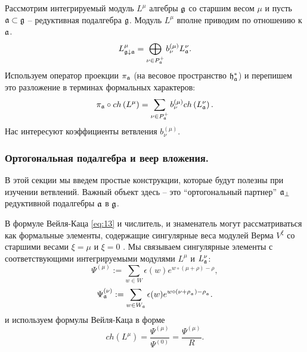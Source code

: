 Рассмотрим интегрируемый модуль $L^{\mu }$ алгебры $\mathfrak{g}$ со старшим весом  $\mu$ и пусть  $\mathfrak{a}\subset\mathfrak{g}$ -- редуктивная подалгебра $\mathfrak{g}$. Модуль $L^{\mu}$ вполне приводим по отношению к $\mathfrak{a}$.
\begin{equation*}
 L_{\mathfrak{g}\downarrow \mathfrak{a}}^{\mu }=\bigoplus
\limits_{\nu \in P_{\mathfrak{a}}^{+}}b_{\nu }^{\left( \mu \right) }L_{\mathfrak{a}}^{\nu }.
\end{equation*}
Используем оператор проекции  $\pi_{\mathfrak{a}}$ (на весовое пространство $\mathfrak{h}_{\mathfrak{a}}^*$) и перепишем это разложение в терминах формальных характеров:
\begin{equation}
\label{branching1}
 \pi _{\mathfrak{a}}\circ ch\left( L^{\mu }\right)
 =\sum_{\nu \in P_{\mathfrak{a}}^{+}}b_{\nu }^{(\mu)}ch\left( L_{\mathfrak{a}}^{\nu }\right) .
\end{equation}
Нас интересуют коэффициенты ветвления $b^{(\mu)}_{\nu}$.

\subsubsection{Ортогональная подалгебра и веер вложения.}
\label{subsec:branching-orthog-pair}

В этой секции мы введем простые конструкции, которые будут полезны при изучении ветвлений. Важный объект здесь -- это ``ортогональный партнер''  $\mathfrak{a}_{\perp}$ редуктивной подалгебры $\mathfrak{a}$ в  $\mathfrak{g}$.

В формуле Вейля-Каца \eqref{eq:13} и числитель, и знаменатель могут рассматриваться как формальные элементы, содержащие сингулярные веса модулей Верма $V^{\xi}$ со старшими весами  $\xi=\mu$ и $\xi=0$ \cite{humphreys1997introduction}.
Мы связываем сингулярные элементы с соответствующими интегрируемыми модулями  $L^{\mu }$ и $L_{\mathfrak{a}}^{\nu }$:
\begin{equation*}
\Psi ^{\left( \mu \right) }:=\sum\limits_{w\in W}\epsilon (w)e^{w\circ (\mu +\rho )-\rho },
\end{equation*}
\begin{equation*}
\Psi _{ \mathfrak{a}}^{\left( \nu \right) }:= \sum\limits_{w\in W_{\mathfrak{a}}}\epsilon (w)e^{w\circ (\nu +\rho_{_{\mathfrak{a}}})-\rho _{_{\mathfrak{a}}}}.
\end{equation*}
и используем формулы Вейля-Каца в форме
\begin{equation}
\label{Weyl-Kac2}
ch\left( L^{\mu }\right) =\frac{\Psi ^{\left( \mu \right) }}{\Psi ^{\left( 0 \right) }}=\frac{\Psi ^{\left( \mu \right) }}{R}.
\end{equation}

